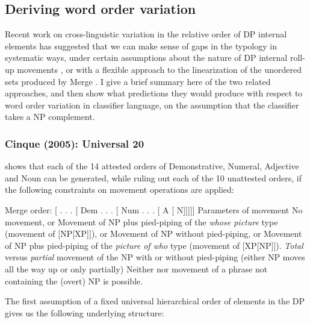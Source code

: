 \documentclass[output=paper
,modfonts
,nonflat]{langsci/langscibook}
\begin{document}
\subsection{Deriving word order variation}

Recent work on cross-linguistic variation in the relative order of DP internal elements has suggested that we can make sense of gaps in the typology in systematic ways, under certain assumptions about the nature of DP internal roll-up movements \citep{Cinque1996,Cinque2005}, or with a flexible approach to the linearization of the unordered sets produced by Merge \citep{AbelsNeeleman2012}. I give a brief summary here of the two related approaches, and then show what predictions they would produce with respect to word order variation in classifier language, on the assumption that the classifier takes a NP complement. 

\subsubsection{Cinque (2005): Universal 20}
\citet{Cinque2005} shows that each of the 14 attested orders of Demonstrative, Numeral, Adjective and Noun can be generated, while ruling out each of the 10 unattested orders, if the following constraints on movement operations are applied:

\ea \label{ex:hall:55}
\ea Merge order: [ . . . [ Dem . . . [ Num . . . [ A [ N]]]]]
\ex Parameters of movement
\ea No movement, or
\ex Movement of NP plus pied-piping of the \textit{whose picture} type (movement of [NP[XP]]), or  \label{ex:hall:55bii}
\ex Movement of NP without pied-piping, or \label{ex:hall:55biii}
\ex Movement of NP plus pied-piping of the \textit{picture of who} type (movement of [XP[NP]]). \label{ex:hall:55biv}
\ex \textit{Total} versus \textit{partial} movement of the NP with or without pied-piping (either NP moves all the way up or only partially)
\ex Neither  nor movement of a phrase not containing the (overt) NP is possible.
\z
\z
\z

The first assumption of a fixed universal hierarchical order of elements in the DP gives us the following underlying structure:

\ea \label{ex:hall:56} %
\end{document}
